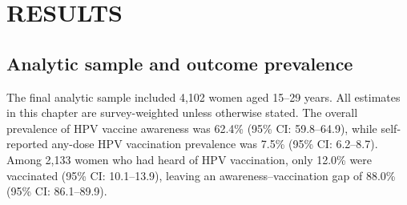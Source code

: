 \chapter{RESULTS}

\section{Analytic sample and outcome prevalence}

The final analytic sample included 4,102 women aged 15--29 years. All estimates in this chapter are survey-weighted unless otherwise stated. The overall prevalence of HPV vaccine awareness was 62.4\% (95\% CI: 59.8--64.9), while self-reported any-dose HPV vaccination prevalence was 7.5\% (95\% CI: 6.2--8.7). Among 2,133 women who had heard of HPV vaccination, only 12.0\% were vaccinated (95\% CI: 10.1--13.9), leaving an awareness--vaccination gap of 88.0\% (95\% CI: 86.1--89.9).

